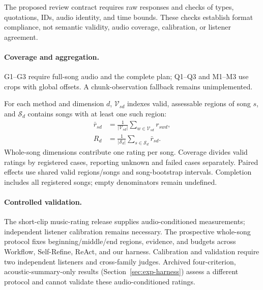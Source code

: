 The proposed review contract requires raw responses and checks of types, quotations,
IDs, audio identity, and time bounds. These checks establish format compliance,
not semantic validity, audio coverage, calibration, or listener agreement.

\paragraph{Coverage and aggregation.}
G1--G3 require full-song audio and the complete plan; Q1--Q3 and M1--M3 use crops
with global offsets. A chunk-observation fallback remains unimplemented.

For each method and dimension $d$, $\mathcal V_{sd}$ indexes valid,
assessable regions of song $s$, and $\mathcal S_d$ contains songs with
at least one such region:
\begin{equation}
\label{eq:rubric-aggregation}
\begin{aligned}
\bar r_{sd}&=\frac{1}{|\mathcal V_{sd}|}
                  \sum_{w\in\mathcal V_{sd}}r_{swd},\\
R_d&=\frac{1}{|\mathcal S_d|}\sum_{s\in\mathcal S_d}\bar r_{sd}.
\end{aligned}
\end{equation}
Whole-song dimensions contribute one rating per song. Coverage divides
valid ratings by registered cases, reporting unknown and failed cases
separately. Paired effects use shared valid
regions/songs and song-bootstrap intervals. Completion includes all
registered songs; empty denominators remain undefined.

\paragraph{Controlled validation.}
The short-clip music-rating release supplies audio-conditioned measurements;
independent listener calibration remains necessary. The prospective
whole-song protocol fixes beginning/middle/end regions,
evidence, and budgets across Workflow, Self-Refine, ReAct, and our harness.
Calibration and validation require two independent listeners and
cross-family judges. Archived four-criterion, acoustic-summary-only
results (Section~\ref{sec:exp-harness}) assess a different protocol and
cannot validate these audio-conditioned ratings.
